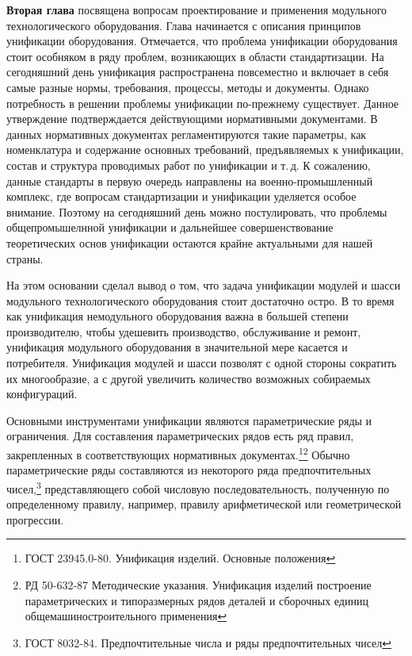 \textbf{Вторая глава} посвящена вопросам проектирование и применения модульного технологического оборудования. Глава начинается с описания принципов унификации оборудования. Отмечается, что проблема унификации оборудования стоит особняком в ряду проблем, возникающих в области стандартизации. На сегодняшний день унификация распространена повсеместно и включает в себя самые разные нормы, требования, процессы, методы и документы. Однако потребность в решении проблемы унификации по-прежнему существует. Данное утверждение подтверждается действующими нормативными документами. В данных нормативных документах регламентируются такие параметры, как номенклатура и содержание основных требований, предъявляемых к унификации, состав и структура проводимых работ по унификации и т.\,д. К сожалению, данные стандарты в первую очередь направлены на военно-промышленный комплекс, где вопросам стандартизации и унификации уделяется особое внимание. Поэтому на сегодняшний день можно постулировать, что проблемы общепромышелнной унификации и дальнейшее совершенствование теоретических основ унификации остаются крайне актуальными для нашей страны. 

На этом основании сделал вывод о том, что задача унификации модулей и шасси модульного технологического оборудования стоит достаточно остро. В то время как унификация немодульного оборудования важна в большей степени производителю, чтобы удешевить производство, обслуживание и ремонт, унификация модульного оборудования в значительной мере касается и потребителя. Унификация модулей и шасси позволят с одной стороны сократить их многообразие, а с другой увеличить количество возможных собираемых конфигураций. 

Основными инструментами унификации являются параметрические ряды и ограничения. Для составления параметрических рядов есть ряд правил, закрепленных в соответствующих нормативных документах.\footnote{ГОСТ 23945.0-80. Унификация изделий. Основные положения}\footnote{РД 50-632-87 Методические указания. Унификация изделий построение параметрических и типоразмерных рядов деталей и сборочных единиц общемашиностроительного применения} Обычно параметрические ряды составляются из некоторого ряда предпочтительных чисел,\footnote{ГОСТ 8032-84. Предпочтительные числа и ряды предпочтительных чисел} представляющего собой числовую последовательность, полученную по определенному правилу, например, правилу арифметической или геометрической прогрессии.

